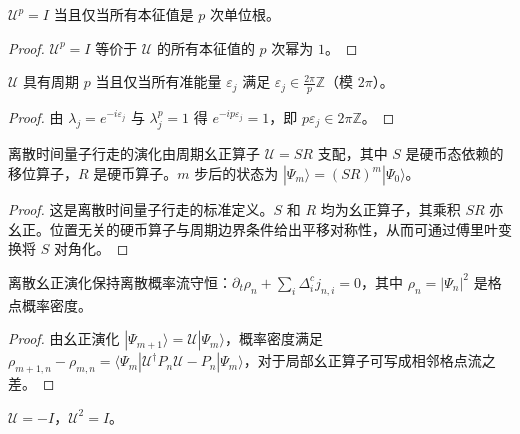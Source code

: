 \begin{proposition}[离散幺正算子的周期条件]\label{prop:discrete_period_condition}
$\mathcal{U}^p=I$ 当且仅当所有本征值是 $p$ 次单位根。
\end{proposition}

\begin{proof}
$\mathcal{U}^p=I$ 等价于 $\mathcal{U}$ 的所有本征值的 $p$ 次幂为 $1$。
\end{proof}

\begin{corollary}[周期性与准能量的有理相关性]\label{cor:period_quasienergy}
$\mathcal{U}$ 具有周期 $p$ 当且仅当所有准能量 $\varepsilon_j$ 满足 $\varepsilon_j\in\frac{2\pi}{p}\mathbb{Z}$（模 $2\pi$）。
\end{corollary}

\begin{proof}
由 $\lambda_j=e^{-i\varepsilon_j}$ 与 $\lambda_j^p=1$ 得 $e^{-ip\varepsilon_j}=1$，即 $p\varepsilon_j\in 2\pi\mathbb{Z}$。
\end{proof}

\begin{proposition}[离散时间量子行走的演化算子]\label{prop:dtqw_evolution}
离散时间量子行走的演化由周期幺正算子 $\mathcal{U}=SR$ 支配，其中 $S$ 是硬币态依赖的移位算子，$R$ 是硬币算子。$m$ 步后的状态为 $|\Psi_m\rangle=(SR)^m|\Psi_0\rangle$。
\end{proposition}

\begin{proof}
这是离散时间量子行走的标准定义。$S$ 和 $R$ 均为幺正算子，其乘积 $SR$ 亦幺正。位置无关的硬币算子与周期边界条件给出平移对称性，从而可通过傅里叶变换将 $S$ 对角化。
\end{proof}

\begin{proposition}[离散幺正演化与离散流守恒]\label{prop:discrete_current_conservation}
离散幺正演化保持离散概率流守恒：$\partial_t\rho_n+\sum_i\Delta_i^cj_{n,i}=0$，其中 $\rho_n=|\Psi_n|^2$ 是格点概率密度。
\end{proposition}

\begin{proof}
由幺正演化 $|\Psi_{m+1}\rangle=\mathcal{U}|\Psi_m\rangle$，概率密度满足 $\rho_{m+1,n}-\rho_{m,n}=\langle\Psi_m|\mathcal{U}^\dagger P_n\mathcal{U}-P_n|\Psi_m\rangle$，对于局部幺正算子可写成相邻格点流之差。
\end{proof}

\begin{example}[格点上的二阶周期振荡]\label{ex:lattice_c2}
$\mathcal{U}=-I$，$\mathcal{U}^2=I$。
\end{example}

